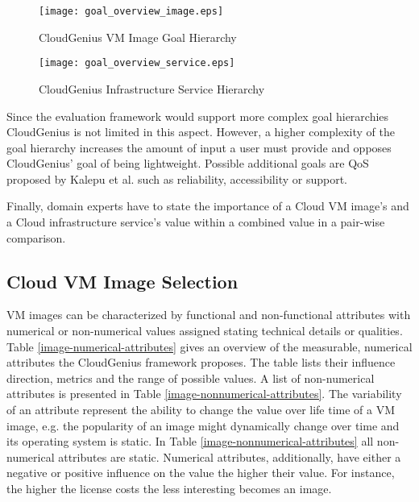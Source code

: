 \documentclass[10pt]{article}
\begin{document}
\begin{figure}[h]
\centering
\texttt{[image: goal\_overview\_image.eps]} 
\caption{CloudGenius VM Image Goal Hierarchy}\label{overview-image-goals}
\end{figure}

\begin{figure}[h]
\centering
\texttt{[image: goal\_overview\_service.eps]} 
\caption{CloudGenius Infrastructure Service Hierarchy}\label{overview-service-goals}
\end{figure}

Since the  evaluation framework would support more complex goal hierarchies CloudGenius is not limited in this aspect. However, a higher complexity of the goal hierarchy increases the amount of input a user must provide and opposes CloudGenius' goal of being lightweight. Possible additional goals are QoS proposed by Kalepu et al. \cite{kalepu2003verity} such as reliability, accessibility or support.

Finally, domain experts have to state the importance of a Cloud VM image's and a Cloud infrastructure service's value within a combined value in a pair-wise comparison.

\subsection{Cloud VM Image Selection}

VM images can be characterized by functional and non-functional attributes with numerical or non-numerical values assigned stating technical details or qualities. Table \ref{image-numerical-attributes} gives an overview of the measurable, numerical attributes the CloudGenius framework proposes. The table lists their influence direction, metrics and the range of possible values. A list of non-numerical attributes is presented in Table \ref{image-nonnumerical-attributes}. The variability of an attribute represent the ability to change the value over life time of a VM image, e.g. the popularity of an image might dynamically change over time and its operating system is static. In Table \ref{image-nonnumerical-attributes} all non-numerical attributes are static. Numerical attributes, additionally, have either a negative or positive influence on the value the higher their value. For instance, the higher the license costs the less interesting becomes an image.
\end{document}
